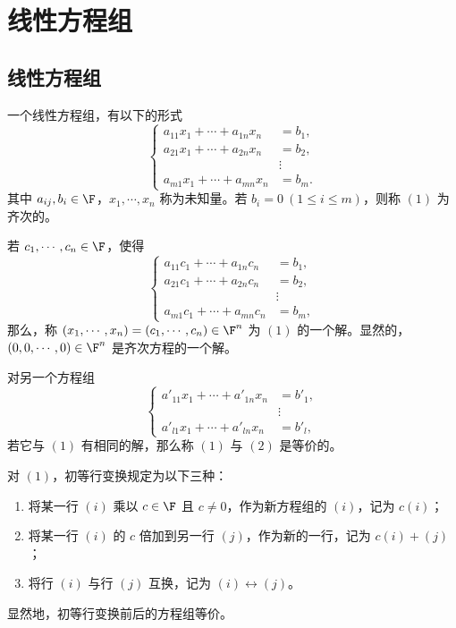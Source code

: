 \setchapterintro{}
\chapter{线性方程组}

\section{线性方程组}
\begin{definition}\label{p1:concept:c2-l7}
	一个线性方程组，有以下的形式
	\begin{equation}\tag{1}
		\left\{
		\begin{aligned}
			a_{11}x_1+\cdots+a_{1n}x_n&=b_1,\\
			a_{21}x_1+\cdots+a_{2n}x_n&=b_2,\\
			&\vdots\\
			a_{m1}x_1+\cdots+a_{mn}x_n&=b_m.
		\end{aligned}
		\right.
	\end{equation}
	其中 $a_{ij},b_i\in\F$，$x_1,\cdots,x_n$ 称为未知量。若 $b_i=0\ (1\leq i\leq m)$，则称 $(1)$ 为齐次的。
	
	若 $c_1,\cdots,c_n\in\F$，使得
	\[
	\left\{
	\begin{aligned}
		a_{11}c_1+\cdots+a_{1n}c_n&=b_1,\\
		a_{21}c_1+\cdots+a_{2n}c_n&=b_2,\\
		&\vdots\\
		a_{m1}c_1+\cdots+a_{mn}c_n&=b_m,
	\end{aligned}
	\right.
	\]
	那么，称 $(x_1,\cdots,x_n)=(c_1,\cdots,c_n)\in\F^n$ 为 $(1)$ 的一个解。显然的，$(0,0,\cdots,0)\in\F^n$ 是齐次方程的一个解。
	
	对另一个方程组
	\begin{equation}\tag{2}
		\left\{
		\begin{aligned}
			a'_{11}x_1+\cdots+a'_{1n}x_n&=b'_1,\\
			&\vdots\\
			a'_{l1}x_1+\cdots+a'_{ln}x_n&=b'_l,
		\end{aligned}
		\right.
	\end{equation}
	若它与 $(1)$ 有相同的解，那么称 $(1)$ 与 $(2)$ 是等价的。
\end{definition}

\begin{definition}\label{p1:concept:c2-l47}
	对 $(1)$，初等行变换规定为以下三种：
	\begin{enumerate}
		\item 将某一行 $(i)$ 乘以 $c\in\F$ 且 $c\neq0$，作为新方程组的 $(i)$，记为 $c(i)$；
		\item 将某一行 $(i)$ 的 $c$ 倍加到另一行 $(j)$，作为新的一行，记为 $c(i)+(j)$；
		\item 将行 $(i)$ 与行 $(j)$ 互换，记为 $(i)\leftrightarrow(j)$。
	\end{enumerate}
	
\end{definition}
显然地，初等行变换前后的方程组等价。



